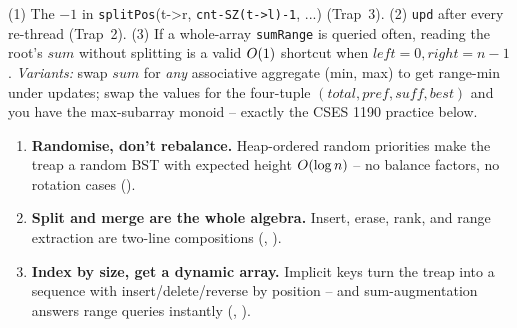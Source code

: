
\begin{warningbox}
(1) The $-1$ in \texttt{splitPos}(t->r, \texttt{cnt-SZ(t->l)-1}, ...) (Trap~3). (2) \texttt{upd} after every
re-thread (Trap~2). (3) If a whole-array \texttt{sumRange} is queried often, reading the root's $\mathit{sum}$
without splitting is a valid $O(1)$ shortcut when $\mathit{left}=0,\mathit{right}=n-1$. \emph{Variants:}
swap $\mathit{sum}$ for \emph{any} associative aggregate (min, max) to get range-min under updates; swap the
values for the four-tuple $(\mathit{total},\mathit{pref},\mathit{suff},\mathit{best})$ and you have the
max-subarray monoid -- exactly the CSES 1190 practice below.
\end{warningbox}

\begin{insightbox}
\begin{enumerate}[nosep, leftmargin=1.6em]
  \item \textbf{Randomise, don't rebalance.} Heap-ordered random priorities make the treap a random BST
        with expected height $O(\log n)$ -- no balance factors, no rotation cases ().
  \item \textbf{Split and merge are the whole algebra.} Insert, erase, rank, and range extraction are
        two-line compositions (, ).
  \item \textbf{Index by size, get a dynamic array.} Implicit keys turn the treap into a sequence with
        insert/delete/reverse by position -- and sum-augmentation answers range queries instantly
        (, ).
\end{enumerate}
\end{insightbox}

